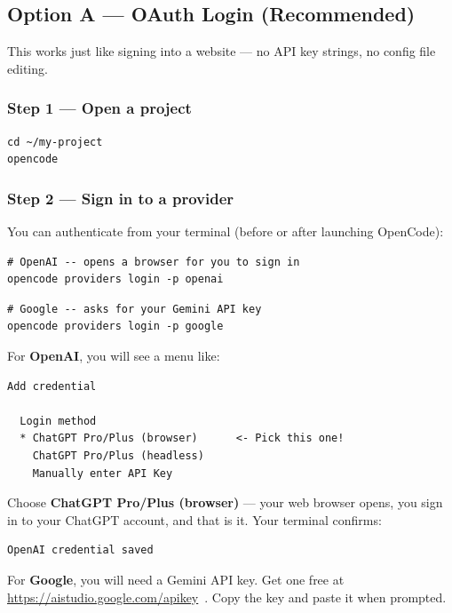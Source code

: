 \documentclass[11pt]{article}
\begin{document}
\subsection{Option A --- OAuth Login (Recommended)}

This works just like signing into a website --- no API key strings, no config file editing.

\subsubsection*{Step 1 --- Open a project}

\begin{lstlisting}[style=term]
cd ~/my-project
opencode
\end{lstlisting}

\subsubsection*{Step 2 --- Sign in to a provider}

You can authenticate from your terminal (before or after launching OpenCode):

\begin{lstlisting}[style=term]
# OpenAI -- opens a browser for you to sign in
opencode providers login -p openai
\end{lstlisting}

\begin{lstlisting}[style=term]
# Google -- asks for your Gemini API key
opencode providers login -p google
\end{lstlisting}

For \textbf{OpenAI}, you will see a menu like:

\begin{lstlisting}[style=term]
  Add credential

  Login method
  * ChatGPT Pro/Plus (browser)      <- Pick this one!
    ChatGPT Pro/Plus (headless)
    Manually enter API Key
\end{lstlisting}

Choose \textbf{ChatGPT Pro/Plus (browser)} --- your web browser opens, you sign in to your ChatGPT account, and that is it.  Your terminal confirms:

\begin{lstlisting}[style=term]
  OpenAI credential saved
\end{lstlisting}

For \textbf{Google}, you will need a Gemini API key.  Get one free at \url{https://aistudio.google.com/apikey}~\cite{google_aistudio2026}.  Copy the key and paste it when prompted.
\end{document}
